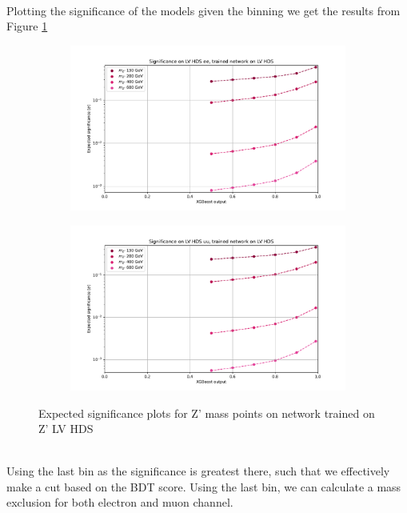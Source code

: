 \documentclass[14pt, a4paper]{book}
\begin{document}
\\Plotting the significance of the models given the binning we get the results from Figure \ref{fig:LV_HDS_exp_sig}
\begin{figure}[!ht]
	\centering
	\begin{subfigure}[b]{0.49\textwidth}
      \centering
      \includegraphics[width=1\textwidth]{XGBoost/LV_HDS/EXP_SIG_ee.pdf}
      \end{subfigure}
   \hfill
   \begin{subfigure}[b]{0.49\textwidth}
      \centering
      \includegraphics[width=1\textwidth]{XGBoost/LV_HDS/EXP_SIG_uu.pdf}
      \end{subfigure}
   \caption{Expected significance plots for Z' mass points on network trained on Z' LV HDS}\label{fig:LV_HDS_exp_sig}
\end{figure}
\\Using the last bin as the significance is greatest there, such that we effectively make a cut based on the BDT score. Using the last bin, we can calculate a mass exclusion for both electron and muon channel.\\
\end{document}
